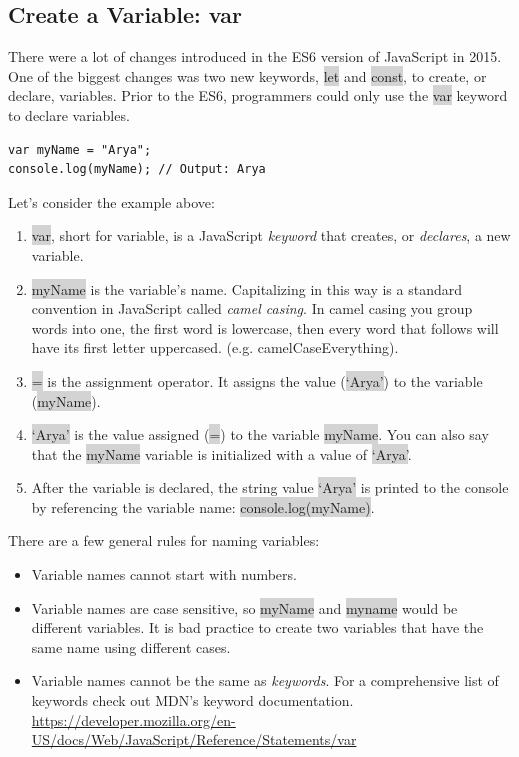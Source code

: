\documentclass[11pt]{article}
\begin{document}
\subsection{Create a Variable: var} 
There were a lot of changes introduced in the ES6 version of JavaScript in 2015. One of the biggest changes was two new keywords, \colorbox{lightgray}{let} and \colorbox{lightgray}{const}, to create, or declare, variables. Prior to the ES6, programmers could only use the \colorbox{lightgray}{var} keyword to declare variables.
\begin{lstlisting}
var myName = "Arya";
console.log(myName); // Output: Arya
\end{lstlisting}
Let’s consider the example above:
\begin{enumerate}[leftmargin = *]
\item \colorbox{lightgray}{var}, short for variable, is a JavaScript \textit{keyword} that creates, or \textit{declares}, a new variable.
\item \colorbox{lightgray}{myName} is the variable’s name. Capitalizing in this way is a standard convention in JavaScript called \textit{camel casing}. In camel casing you group words into one, the first word is lowercase, then every word that follows will have its first letter uppercased. (e.g. camelCaseEverything).
\item \colorbox{lightgray}{=} is the assignment operator. It assigns the value (\colorbox{lightgray}{`Arya'}) to the variable (\colorbox{lightgray}{myName}).
\item \colorbox{lightgray}{`Arya'} is the value assigned (\colorbox{lightgray}{=}) to the variable \colorbox{lightgray}{myName}. You can also say that the \colorbox{lightgray}{myName} variable is initialized with a value of \colorbox{lightgray}{`Arya'}.
\item After the variable is declared, the string value \colorbox{lightgray}{`Arya'} is printed to the console by referencing the variable name: \colorbox{lightgray}{console.log(myName)}.
\end{enumerate}
There are a few general rules for naming variables:
\begin{itemize}[leftmargin = *]
\item Variable names cannot start with numbers.
\item Variable names are case sensitive, so \colorbox{lightgray}{myName} and \colorbox{lightgray}{myname} would be different variables. It is bad practice to create two variables that have the same name using different cases.
\item Variable names cannot be the same as \textit{keywords}. For a comprehensive list of keywords check out MDN’s keyword documentation. \\
\underline{https://developer.mozilla.org/en-US/docs/Web/JavaScript/Reference/Statements/var}
\end{itemize}
\end{document}
